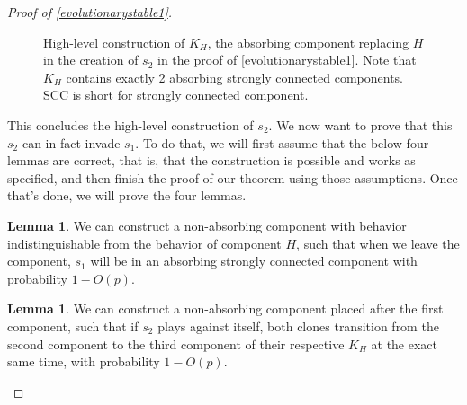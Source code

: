 \documentclass[12pt]{article}
\theoremstyle{definition}
\newtheorem{lemma}[theorem]{Lemma}
\theoremstyle{remark}
\begin{document}
\begin{proof}[Proof of \cref{evolutionarystable1}]
\begin{figure}
        \caption{High-level construction of $K_H$, the absorbing component replacing $H$ in the creation of $s_2$ in the proof of \cref{evolutionarystable1}. Note that $K_H$ contains exactly 2 absorbing strongly connected components. SCC is short for strongly connected component.}
        \label{c2flowchart}
      \end{figure}
      
      This concludes the high-level construction of $s_2$. We now want to prove that this $s_2$ can in fact invade $s_1$. To do that, we will first assume that the below four lemmas are correct, that is, that the construction is possible and works as specified, and then finish the proof of our theorem using those assumptions. Once that's done, we will prove the four lemmas.

      \begin{lemma}
        \label{claimcanwaitfors1}
        We can construct a non-absorbing component with behavior indistinguishable from the behavior of component $H$, such that when we leave the component, $s_1$ will be in an absorbing strongly connected component with probability $1 - O(p)$.
      \end{lemma}

      \begin{lemma}
        \label{claimcansyncs2}
        We can construct a non-absorbing component placed after the first component, such that if $s_2$ plays against itself, both clones transition from the second component to the third component of their respective $K_H$ at the exact same time, with probability $1 - O(p)$.
      \end{lemma}


\end{proof}
\end{document}
